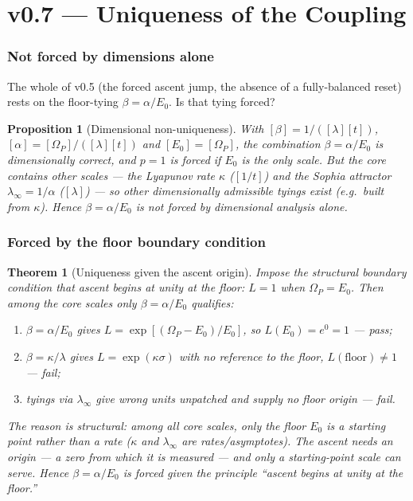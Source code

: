 \documentclass[11pt,a4paper]{article}
\theoremstyle{plain}
\newtheorem{proposition}{Proposition}
\newtheorem{theorem}{Theorem}
\theoremstyle{definition}
\theoremstyle{remark}
\begin{document}
\part*{v0.7 --- Uniqueness of the Coupling}

\section{Not forced by dimensions alone}

The whole of v0.5 (the forced ascent jump, the absence of a fully-balanced reset) rests on the
floor-tying $\beta=\alpha/E_0$. Is that tying forced?

\begin{proposition}[Dimensional non-uniqueness]\label{prop:dimnonuniq}
With $[\beta]=1/([\lambda][t])$, $[\alpha]=[\Omega_P]/([\lambda][t])$ and $[E_0]=[\Omega_P]$, the
combination $\beta=\alpha/E_0$ is dimensionally correct, and $p=1$ is forced \emph{if $E_0$ is the only
scale}. But the core contains other scales --- the Lyapunov rate $\kappa$ ($[1/t]$) and the Sophia
attractor $\lambda_\infty=1/\alpha$ ($[\lambda]$) --- so other dimensionally admissible tyings exist
(e.g.\ built from $\kappa$). Hence $\beta=\alpha/E_0$ is \emph{not} forced by dimensional analysis
alone.
\end{proposition}

\section{Forced by the floor boundary condition}

\begin{theorem}[Uniqueness given the ascent origin]\label{thm:uniqueness}
Impose the structural boundary condition that ascent \emph{begins at unity at the floor}: $L=1$ when
$\Omega_P=E_0$. Then among the core scales only $\beta=\alpha/E_0$ qualifies:
\begin{enumerate}[label=(\roman*),leftmargin=1.8em,itemsep=2pt]
\item $\beta=\alpha/E_0$ gives $L=\exp[(\Omega_P-E_0)/E_0]$, so $L(E_0)=e^0=1$ --- \emph{pass};
\item $\beta=\kappa/\lambda$ gives $L=\exp(\kappa\sigma)$ with no reference to the floor, $L(\text{floor})\neq1$
--- \emph{fail};
\item tyings via $\lambda_\infty$ give wrong units unpatched and supply no floor origin --- \emph{fail}.
\end{enumerate}
The reason is structural: among all core scales, only the floor $E_0$ is a \emph{starting point}
rather than a \emph{rate} ($\kappa$ and $\lambda_\infty$ are rates/asymptotes). The ascent needs an
origin --- a zero from which it is measured --- and only a starting-point scale can serve. Hence
$\beta=\alpha/E_0$ is forced \emph{given} the principle ``ascent begins at unity at the floor.''
\end{theorem}
\end{document}
